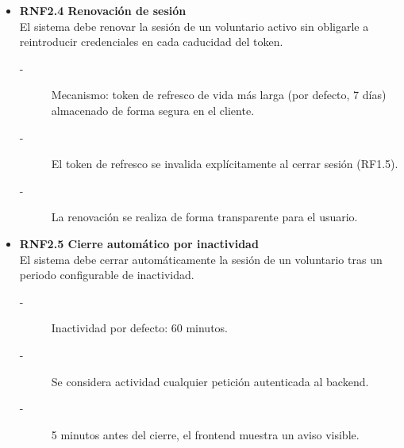 \begin{itemize}
    \item \textbf{RNF2.4 Renovación de sesión} \\
    El sistema debe renovar la sesión de un voluntario activo sin obligarle
    a reintroducir credenciales en cada caducidad del token.
    \begin{description}
        \item[-] Mecanismo: token de refresco de vida más larga (por defecto, 7 días) almacenado de forma segura en el cliente. 
        \item[-] El token de refresco se invalida explícitamente al cerrar sesión (RF1.5).
        \item[-] La renovación se realiza de forma transparente para el usuario.
    \end{description}


    \item \textbf{RNF2.5 Cierre automático por inactividad} \\
    El sistema debe cerrar automáticamente la sesión de un voluntario
    tras un periodo configurable de inactividad.
    \begin{description}
        \item[-] Inactividad por defecto: 60 minutos.
        \item[-] Se considera actividad cualquier petición autenticada al backend.
        \item[-] 5 minutos antes del cierre, el frontend muestra un aviso visible.
    \end{description}
\end{itemize}



